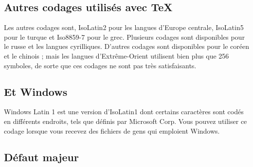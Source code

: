 \documentclass[11pt,french]{article}
\newcommand{\acr}[1]{\textsf{#1}}
\begin{document}
\subsection{Autres codages utilisés avec \TeX}

Les autres codages sont, \acr{IsoLatin2} pour les langues d'Europe centrale, \acr{IsoLatin5} pour le turque et \acr{Iso8859-7} pour le grec. Plusieurs codages sont disponibles pour le russe et les langues cyrilliques. D'autres codages sont disponibles pour le coréen et le chinois ; mais les langues d'Extrême-Orient utilisent bien plus que 256 symboles, de sorte que ces codages ne sont pas très satisfaisants.

\subsection{Et Windows}

\acr{Windows Latin 1} est une version d'\acr{IsoLatin1} dont certains caractères sont codés en différents endroits, tels que définis par Microsoft Corp. Vous pouvez utiliser ce codage lorsque vous recevez des fichiers de gens qui emploient Windows.

\subsection{Défaut majeur}
\end{document}
